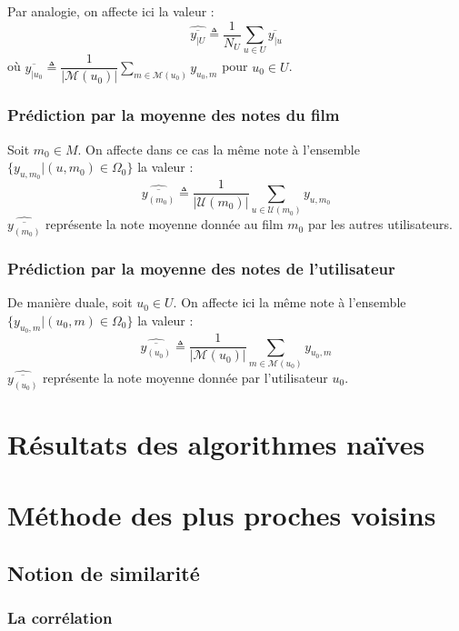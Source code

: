 \documentclass[a4paper, 11pt]{book}
\begin{document}
Par analogie, on affecte ici la valeur : 
$$\hat{\overline{y_{|U}}}  \triangleq \displaystyle \dfrac{1}{N_U} \sum \limits_{u \in U} \overline{y_{|u}}$$
où  $\overline{y_{|u_0}} \triangleq \displaystyle \dfrac{1}{|\mathcal{M}(u_0)|} \sum \limits_{m \in \mathcal{M}(u_0) } y_{u_0,m}$ pour $u_0 \in U$.

\subsubsection{Prédiction par la moyenne des notes du film}

Soit $m_0 \in M$. On affecte dans ce cas la même note à l'ensemble $\{y_{u,m_0} \vert (u,m_0) \in \Omega_0 \}$ la valeur : 
$$\widehat{\overline{y_{(m_0)}}} \triangleq  \displaystyle \dfrac{1}{| \mathcal{U}(m_0) |} \sum \limits_{ u \in \mathcal{U}(m_0)} y_{u,m_0}$$
$\widehat{\overline{y_{(m_0)}}}$ représente la note moyenne donnée au film $m_0$ par les autres utilisateurs.
 
\subsubsection{Prédiction par la moyenne des notes de l'utilisateur}

De manière duale, soit $u_0 \in U$. On affecte ici la même note à l'ensemble $\{y_{u_0,m} \vert (u_0,m) \in \Omega_0 \}$ la valeur : 
$$\widehat{\overline{y_{(u_0)}}} \triangleq \displaystyle \dfrac{1}{\vert \mathcal{M}(u_0) \vert} \sum \limits_{m \in \mathcal{M}(u_0)} y_{u_0,m}$$
$\widehat{\overline{y_{(u_0)}}}$ représente la note moyenne donnée par l'utilisateur $u_0$.

\section{Résultats des algorithmes naïves}

\section{Méthode des plus proches voisins}

\subsection{Notion de similarité}

\subsubsection{La corrélation}
\end{document}
